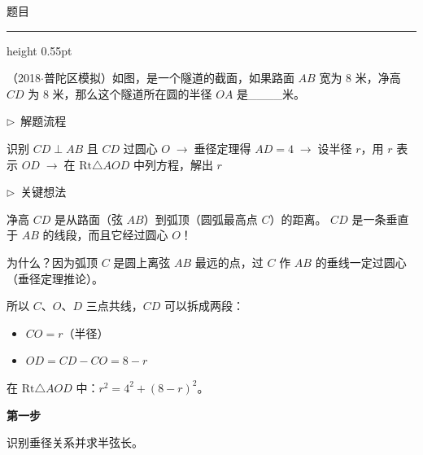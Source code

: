 \documentclass{exam-zh}
\newcommand{\edukai}{\kaishu}
\newenvironment{eduSubQuestionItem}[1]{%
  \needspace{4\baselineskip}%
  \vspace{2mm}
  \par\noindent
  \hangindent=8mm\hangafter=1
  {\color{edu-blue}\bfseries #1}\enspace
  \begingroup
  \color{edu-ink}
}{%
  \endgroup
  \par
  \vspace{3mm}
}
\newenvironment{eduAuxItem}[1]{%
  \needspace{4\baselineskip}%
  \vspace{2mm}
  \par\noindent
  \hangindent=8mm\hangafter=1
  {\color{edu-blue}\edukai $\triangleright$~#1}\enspace
  \begingroup
  \color{edu-ink}
  \edukai
}{%
  \endgroup
  \par
  \vspace{4mm}
}
\newenvironment{eduProblemBlock}[1][题目]{%
  \needspace{8\baselineskip}
  {\small\color{edu-muted}#1}\par
  \vspace{1.5mm}
  {\color{edu-blue}\hrule height 0.55pt}
  \vspace{4.5mm}
  \begingroup
  \color{edu-ink}
  \large
  \setlength{\parskip}{2.2mm}
  \linespread{1.20}\selectfont
}{%
  \par
  \endgroup
  \vspace{6mm}
}
\begin{document}
\begin{eduProblemBlock}[题目]
（2018$\cdot$普陀区模拟）如图，是一个隧道的截面，如果路面 $AB$ 宽为 $8$ 米，净高 $CD$ 为 $8$ 米，那么这个隧道所在圆的半径 $OA$ 是\_\_\_\_米。
\end{eduProblemBlock}









\begin{eduAuxItem}{解题流程}
识别 $CD \perp AB$ 且 $CD$ 过圆心 $O$$\;\to\;$垂径定理得 $AD = 4$$\;\to\;$设半径 $r$，用 $r$ 表示 $OD$$\;\to\;$在 $\mathrm{Rt}\triangle AOD$ 中列方程，解出 $r$\end{eduAuxItem}




\begin{eduAuxItem}{关键想法}
净高 $CD$ 是从路面（弦 $AB$）到弧顶（圆弧最高点 $C$）的距离。
$CD$ 是一条垂直于 $AB$ 的线段，而且它经过圆心 $O$！

为什么？因为弧顶 $C$ 是圆上离弦 $AB$ 最远的点，过 $C$ 作 $AB$ 的垂线一定过圆心（垂径定理推论）。

所以 $C$、$O$、$D$ 三点共线，$CD$ 可以拆成两段：
\begin{itemize}
  \item $CO = r$（半径）
  \item $OD = CD - CO = 8 - r$
\end{itemize}
在 $\mathrm{Rt}\triangle AOD$ 中：$r^2 = 4^2 + (8-r)^2$。
\end{eduAuxItem}




\begin{eduSubQuestionItem}{第一步}
识别垂径关系并求半弦长。\end{eduSubQuestionItem}
\end{document}
